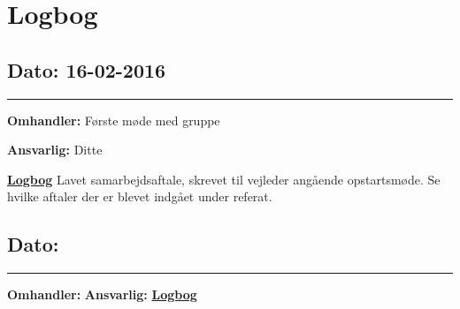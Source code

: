 \chapter{Logbog}

\section{Dato: 16-02-2016}
\hrule
\textbf{Omhandler:} Første møde med gruppe

\textbf{Ansvarlig:} Ditte 

\underline{\textbf{Logbog}}
Lavet samarbejdsaftale, skrevet til vejleder angående opstartsmøde. Se hvilke aftaler der er blevet indgået under referat. 

\section{Dato: }
\hrule
\textbf{Omhandler: }
\textbf{Ansvarlig:}
\underline{\textbf{Logbog}}





